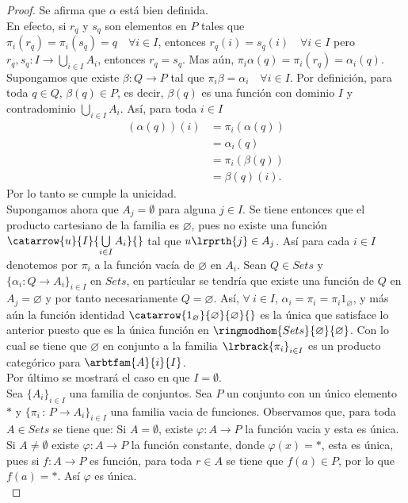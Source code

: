 \documentclass{article}
\begin{document}
\begin{enumerate}[label=\textbf{Ej \arabic*.}]
\begin{proof}
Se afirma que $\alpha$ está bien definida.\\
En efecto, si $r_q$ y $s_q$ son elementos en $P$ tales que \\$\pi_i(r_q)=\pi_i(s_q)=q\quad \forall i\in I$, entonces $r_q(i)=s_q(i)\quad \forall i\in I$
pero \\$r_q,s_q:I\to \displaystyle\bigcup_{i\in I}A_i$, entonces $r_q=s_q$. Mas aún, $\pi_i\alpha(q)=\pi_i(r_q)=\alpha_i(q).$\\

Supongamos que existe $\beta:Q\to P$ tal que $\pi_i\beta=\alpha_i\quad \forall i\in I$. Por definición, para toda $q\in Q$, $\beta(q)\in P$, 
es decir, $\beta(q)$ es una función con dominio $I$ y contradominio $ \displaystyle\bigcup_{i\in I}A_i$. Así, para toda $i\in I$
\begin{align*}
(\alpha(q))(i)&=\pi_i(\alpha(q))\\
&=\alpha_i(q)\\
&=\pi_i(\beta(q))\\
&=\beta(q)(i).
\end{align*}
Por lo tanto se cumple la unicidad.\\

Supongamos ahora que $A_j=\emptyset$ para alguna $j\in I$. Se tiene entonces que el producto cartesiano de la familia es $\varnothing$, pues no existe
 una función $\catarrow{u}{I}{\bigcup\limits_{i\in I}A_i}{}$ tal que $u\lrprth{j}\in A_j$. Así para cada $i\in I$ denotemos por $\pi_i$ a la función vacía 
de $\varnothing$ en $A_i$. Sean $Q\in Sets$ y $\{\alpha_i:Q\to A_i\}_{i\in I}$ en $Sets$, en partícular se tendría que existe una función de $Q$ en
 $A_j=\varnothing$ y por tanto necesariamente $Q=\varnothing$. Así, $\forall\ i\in I$, $\alpha_i=\pi_i=\pi_i1_\varnothing $, y más aún la función 
identidad $\catarrow{1_\varnothing}{\varnothing}{\varnothing}{}$ es la única que satisface lo anterior puesto que es la única función en
 $\ringmodhom{Sets}{\varnothing}{\varnothing}$. Con lo cual se tiene que $\varnothing$ en conjunto a la familia $\lrbrack{\pi_i}_{i\in I}$ 
es un producto categórico para $\arbtfam{A}{i}{I}$.\\

Por último se mostrará el caso en que $I=\emptyset$.\\

Sea $\{A_i\}_{i\in I}$ una familia de conjuntos. Sea $P$ un conjunto con un único elemento $*$ y $\{\pi_i\,:\,P\to A_i\}_{i\in I}$ una familia vacia 
de funciones. Observamos que, para toda $A\in Sets$ se tiene que: Si $A=\emptyset$, existe $\varphi:A\to P$ la 
función vacia y esta es única.\\
Si $A\neq \emptyset$ existe $\varphi:A\to P$ la función constante, donde $\varphi(x)=*$, esta es única, pues si $f:A\to P$ es función, para toda $r\in A$
se tiene que  $f(a)\in P$, por lo que $f(a)=*$. Así $\varphi$ es única.\\


\end{proof}
\end{enumerate}
\end{document}
